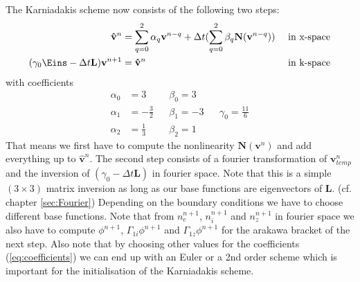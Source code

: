 \documentclass[a4paper,12pt]{scrartcl}
\renewcommand{\vec}[1]{{\mathbf{#1}}}
\begin{document}
The Karniadakis scheme now consists of the following two steps:
\begin{align}
    \vec {\hat v}^n &= \sum_{q=0}^2 \alpha_q\vec v^{n-q} + \Delta t(\sum_{q=0}^2\beta_q \vec N(\vec v^{n-q})) \ &\text{in x-space} \\
    (\gamma_0 \vec \Eins  - \Delta t \vec L) \vec v^{n+1} &= \vec {\hat v}^n  \ &\text{in k-space}
\end{align}
with coefficients
\begin{align}
    \alpha_0 &= 3 \  &&\beta_0 = 3 \nonumber \\
    \alpha_1 &= -\frac{3}{2} && \beta_1 = -3 && \gamma_0 = \frac{11}{6}\label{eq:coefficients}\\
    \alpha_2 &= \frac{1}{3} && \beta_2 = 1 \nonumber
\end{align}
That means we first have to compute the nonlinearity $\vec N(\vec v^{n})$ and add everything up to $\vec {\hat v}^n$. The second step consists of a fourier transformation of $\vec v^n_{temp}$ and the inversion 
of $(\gamma_0 - \Delta t \vec L)$ in fourier space. Note that this is a simple 
$(3\times3)$ matrix inversion as long as our base functions are eigenvectors of $\vec L$. (cf. chapter \ref{sec:Fourier}) Depending on the boundary conditions we have to choose different base functions.
Note that from $n^{n+1}_e$, $n^{n+1}_i$ and $n^{n+1}_z$ in fourier space we also have to compute $\phi^{n+1}$, $\Gamma_{1i}\phi^{n+1}$ and $\Gamma_{1z}\phi^{n+1}$ for the arakawa bracket of the next step.
Also note that by choosing other values for the coefficients (\ref{eq:coefficients}) 
we can end up with an Euler or a 2nd order scheme which is important for the 
initialisation of the Karniadakis scheme.
\end{document}
